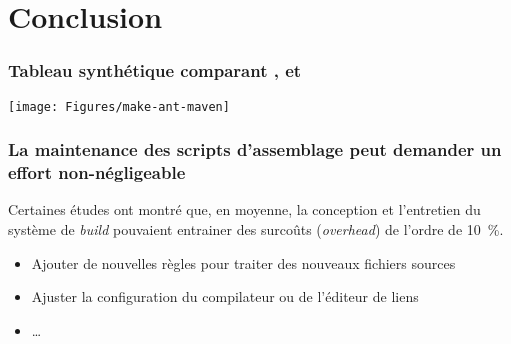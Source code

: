 

\section{Conclusion}

\begin{frame}
\frametitle{Tableau synth\'etique comparant ,  et }

\hspace*{-0.95cm}\texttt{[image: Figures/make-ant-maven]}

\VF



\NOTE{\ }

\end{frame}

\begin{frame}
\frametitle{La maintenance des scripts d'assemblage peut
demander un effort non-n\'egligeable \frownie}

Certaines \'etudes ont montr\'e que, en moyenne, la conception et
l'entretien du syst\`eme de \emph{build} pouvaient entrainer des
\alert{surco\^uts} (\emph{overhead}) de l'ordre de 10~\%.

\pause

\VF

\begin{itemize}
\item Ajouter de nouvelles r\`egles pour traiter des nouveaux fichiers
sources

\item Ajuster la configuration du compilateur ou de l'\'editeur de
liens

\item \ldots
\end{itemize}

\VF


\VF
\NOTE{\ }

\end{frame}


